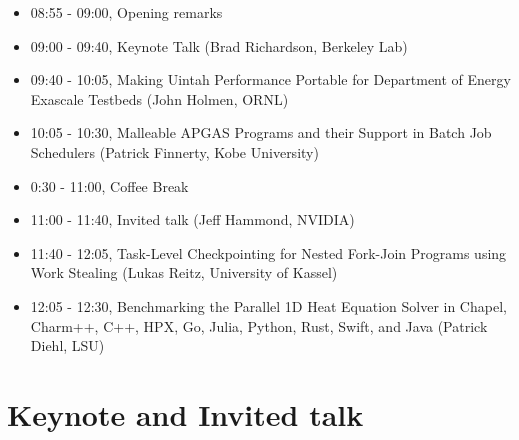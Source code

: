 \documentclass{article}
\begin{document}
\begin{itemize}
 \item 08:55 - 09:00, Opening remarks
 \item 09:00 - 09:40, Keynote Talk (Brad Richardson, Berkeley Lab)
 \item 09:40 - 10:05, Making Uintah Performance Portable for Department of Energy Exascale Testbeds (John Holmen, ORNL)
\item 10:05 - 10:30, Malleable APGAS Programs and their Support in Batch Job Schedulers (Patrick Finnerty, Kobe University)
\item 0:30 - 11:00, Coffee Break
\item 11:00 - 11:40, Invited talk (Jeff Hammond, NVIDIA)
 \item   11:40 - 12:05, Task-Level Checkpointing for Nested Fork-Join Programs using Work Stealing (Lukas Reitz, University of Kassel)
 \item   12:05 - 12:30, Benchmarking the Parallel 1D Heat Equation Solver in Chapel, Charm++, C++, HPX, Go, Julia, Python, Rust, Swift, and Java (Patrick Diehl, LSU)



\end{itemize}

\section{Keynote and Invited talk}

\end{document}
